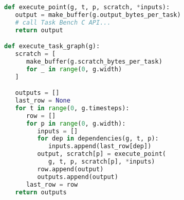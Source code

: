 \begin{lstlisting}[language=Python,caption={Excerpt from Dask implementation.\label{lst:code-sample}},float]
def execute_point(g, t, p, scratch, *inputs):
   output = make_buffer(g.output_bytes_per_task)
   # call Task Bench C API...
   return output

def execute_task_graph(g):
   scratch = [
      make_buffer(g.scratch_bytes_per_task)
      for _ in range(0, g.width)
   ]

   outputs = []
   last_row = None
   for t in range(0, g.timesteps):
      row = []
      for p in range(0, g.width):
         inputs = []
         for dep in dependencies(g, t, p):
            inputs.append(last_row[dep])
         output, scratch[p] = execute_point(
            g, t, p, scratch[p], *inputs)
         row.append(output)
         outputs.append(output)
      last_row = row
   return outputs
\end{lstlisting}
